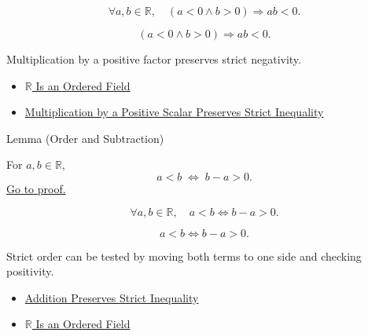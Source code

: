 \begin{remark*}
\[
\forall a,b\in\mathbb{R},\quad (a<0\land b>0)\Rightarrow ab<0.
\]
\end{remark*}

\begin{remark*}
\[
(a<0\land b>0)\Rightarrow ab<0.
\]
\end{remark*}

\begin{remark*}[Interpretation]
Multiplication by a positive factor preserves strict negativity.
\end{remark*}

\begin{dependencies}
\begin{itemize}
  \item \hyperref[thm:r-is-an-ordered-field]{$\mathbb{R}$ Is an Ordered Field}
  \item \hyperref[thm:ineq-multiply-positive]{Multiplication by a Positive Scalar Preserves Strict Inequality}
\end{itemize}
\end{dependencies}

\begin{lemmabox}{Lemma (Order and Subtraction)}
\begin{lemma}\label{lem:order-and-subtraction}
For $a,b\in\mathbb{R}$,
\[
a<b \;\Longleftrightarrow\; b-a>0.
\]
\hyperref[prf:order-and-subtraction]{Go to proof.}
\end{lemma}
\end{lemmabox}

\begin{remark*}
\[
\forall a,b\in\mathbb{R},\quad a<b\Longleftrightarrow b-a>0.
\]
\end{remark*}

\begin{remark*}
\[
a<b\Longleftrightarrow b-a>0.
\]
\end{remark*}

\begin{remark*}[Interpretation]
Strict order can be tested by moving both terms to one side and checking positivity.
\end{remark*}

\begin{dependencies}
\begin{itemize}
  \item \hyperref[thm:ineq-add-both-sides]{Addition Preserves Strict Inequality}
  \item \hyperref[thm:r-is-an-ordered-field]{$\mathbb{R}$ Is an Ordered Field}
\end{itemize}
\end{dependencies}

